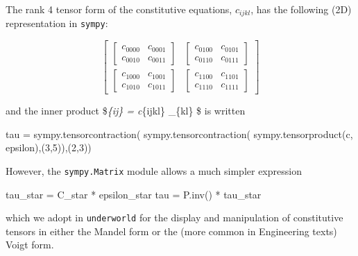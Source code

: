 \documentclass[
  letterpaper,
  DIV=11,
  numbers=noendperiod]{scrreprt}
\newenvironment{Shaded}{\begin{snugshade}}{\end{snugshade}}
\newcommand{\DecValTok}[1]{\textcolor[rgb]{0.68,0.00,0.00}{#1}}
\newcommand{\NormalTok}[1]{\textcolor[rgb]{0.00,0.23,0.31}{#1}}
\newcommand{\OperatorTok}[1]{\textcolor[rgb]{0.37,0.37,0.37}{#1}}
\begin{document}
The rank 4 tensor form of the constitutive equations, \(c_{ijkl}\), has
the following (2D) representation in \texttt{sympy}:

\[\left[\begin{matrix}\left[\begin{matrix}c_{0 0 0 0} & c_{0 0 0 1}\\c_{0 0 1 0} & c_{0 0 1 1}\end{matrix}\right] & \left[\begin{matrix}c_{0 1 0 0} & c_{0 1 0 1}\\c_{0 1 1 0} & c_{0 1 1 1}\end{matrix}\right]\\\left[\begin{matrix}c_{1 0 0 0} & c_{1 0 0 1}\\c_{1 0 1 0} & c_{1 0 1 1}\end{matrix}\right] & \left[\begin{matrix}c_{1 1 0 0} & c_{1 1 0 1}\\c_{1 1 1 0} & c_{1 1 1 1}\end{matrix}\right]\end{matrix}\right]\]

and the inner product \$\tau\emph{\{ij\} = c}\{ijkl\}
\varepsilon\_\{kl\} \$ is written

\begin{Shaded}
\begin{Highlighting}[]
\NormalTok{tau }\OperatorTok{=}\NormalTok{ sympy.tensorcontraction(}
\NormalTok{            sympy.tensorcontraction(}
\NormalTok{                   sympy.tensorproduct(c, epsilon),(}\DecValTok{3}\NormalTok{,}\DecValTok{5}\NormalTok{)),(}\DecValTok{2}\NormalTok{,}\DecValTok{3}\NormalTok{))}
\end{Highlighting}
\end{Shaded}

However, the \texttt{sympy.Matrix} module allows a much simpler
expression

\begin{Shaded}
\begin{Highlighting}[]
\NormalTok{tau\_star }\OperatorTok{=}\NormalTok{ C\_star }\OperatorTok{*}\NormalTok{ epsilon\_star}
\NormalTok{tau }\OperatorTok{=}\NormalTok{ P.inv() }\OperatorTok{*}\NormalTok{ tau\_star}
\end{Highlighting}
\end{Shaded}

which we adopt in \texttt{underworld} for the display and manipulation
of constitutive tensors in either the Mandel form or the (more common in
Engineering texts) Voigt form.
\end{document}
